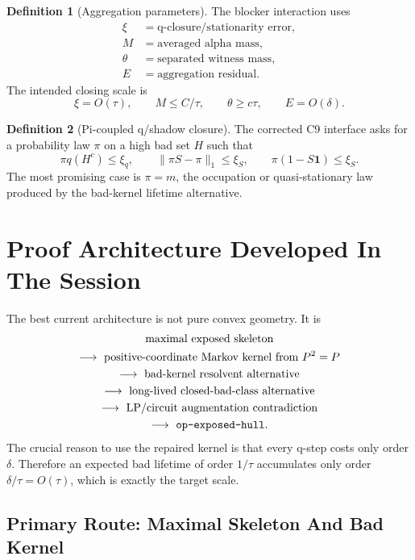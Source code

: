 \documentclass[11pt]{article}
\newcommand{\one}{\mathbf{1}}
\theoremstyle{definition}
\newtheorem{definition}{Definition}
\begin{document}
\begin{definition}[Aggregation parameters]
The blocker interaction uses
\[
\begin{aligned}
  \xi    &= \text{q-closure/stationarity error},\\
  M      &= \text{averaged alpha mass},\\
  \theta &= \text{separated witness mass},\\
  E      &= \text{aggregation residual}.
\end{aligned}
\]
The intended closing scale is
\[
  \xi=O(\tau),\qquad M\leq C/\tau,\qquad
  \theta\geq c\tau,\qquad E=O(\delta).
\]
\end{definition}

\begin{definition}[Pi-coupled q/shadow closure]
The corrected C9 interface asks for a probability law \(\pi\) on a high bad
set \(H\) such that
\[
  \pi q(H^c)\leq \xi_q,\qquad
  \|\pi S-\pi\|_1\leq \xi_S,\qquad
  \pi(1-S\one)\leq \xi_S.
\]
The most promising case is \(\pi=m\), the occupation or quasi-stationary law
produced by the bad-kernel lifetime alternative.
\end{definition}

\section{Proof Architecture Developed In The Session}

The best current architecture is not pure convex geometry.  It is
\[
\begin{gathered}
\text{maximal exposed skeleton}\\
\longrightarrow\ \text{positive-coordinate Markov kernel from }P^2=P\\
\longrightarrow\ \text{bad-kernel resolvent alternative}\\
\longrightarrow\ \text{long-lived closed-bad-class alternative}\\
\longrightarrow\ \text{LP/circuit augmentation contradiction}\\
\longrightarrow\ \text{\texttt{op-exposed-hull}.}
\end{gathered}
\]
The crucial reason to use the repaired kernel is that every q-step costs only
order \(\delta\).  Therefore an expected bad lifetime of order \(1/\tau\)
accumulates only order \(\delta/\tau=O(\tau)\), which is exactly the target
scale.

\subsection{Primary Route: Maximal Skeleton And Bad Kernel}
\end{document}
